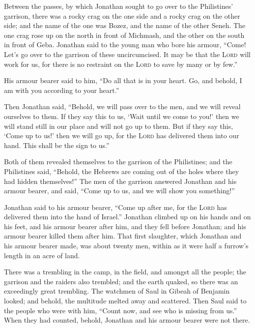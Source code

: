  Between the passes, by which Jonathan sought to go over
to the Philistines' garrison, there was a rocky crag on the one side and
a rocky crag on the other side; and the name of the one was Bozez, and
the name of the other Seneh.  The one crag rose up on the
north in front of Michmash, and the other on the south in front of Geba.
 Jonathan said to the young man who bore his armour,
``Come! Let's go over to the garrison of these uncircumcised. It may be
that the \textsc{Lord} will work for us, for there is no restraint on
the \textsc{Lord} to save by many or by few.''

 His armour bearer said to him, ``Do all that is in your
heart. Go, and behold, I am with you according to your heart.''

 Then Jonathan said, ``Behold, we will pass over to the
men, and we will reveal ourselves to them.  If they say
this to us, `Wait until we come to you!' then we will stand still in our
place and will not go up to them.  But if they say this,
`Come up to us!' then we will go up, for the \textsc{Lord} has delivered
them into our hand. This shall be the sign to us.''

 Both of them revealed themselves to the garrison of the
Philistines; and the Philistines said, ``Behold, the Hebrews are coming
out of the holes where they had hidden themselves!''  The
men of the garrison answered Jonathan and his armour bearer, and said,
``Come up to us, and we will show you something!''

Jonathan said to his armour bearer, ``Come up after me, for the
\textsc{Lord} has delivered them into the hand of Israel.''
 Jonathan climbed up on his hands and on his feet, and
his armour bearer after him, and they fell before Jonathan; and his
armour bearer killed them after him.  That first
slaughter, which Jonathan and his armour bearer made, was about twenty
men, within as it were half a furrow's length in an acre of land.

 There was a trembling in the camp, in the field, and
amongst all the people; the garrison and the raiders also trembled; and
the earth quaked, so there was an exceedingly great trembling.
 The watchmen of Saul in Gibeah of Benjamin looked; and
behold, the multitude melted away and scattered.  Then
Saul said to the people who were with him, ``Count now, and see who is
missing from us.'' When they had counted, behold, Jonathan and his
armour bearer were not there.


